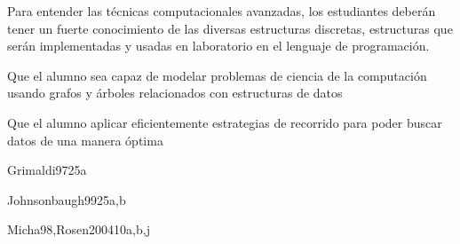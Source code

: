 \begin{syllabus}


\begin{justification}
Para entender las técnicas computacionales avanzadas, los estudiantes deberán tener un fuerte conocimiento de las
diversas estructuras discretas, estructuras que serán implementadas y usadas en laboratorio en el lenguaje de programación.
\end{justification}

\begin{goals}
\item Que el alumno sea capaz de modelar problemas de ciencia de la computación usando grafos y árboles relacionados con estructuras de datos
\item Que el alumno aplicar eficientemente estrategias de recorrido para poder buscar datos de una manera óptima
\end{goals}

\begin{outcomes}
\end{outcomes}

\begin{unit}{\DSBasicCountingDef}{Grimaldi97}{25}{a}
   \DSBasicCountingAllTopics
   \DSBasicCountingAllObjectives
\end{unit}

\begin{unit}{\DSGraphsAndTreesDef}{Johnsonbaugh99}{25}{a,b}
   \DSGraphsAndTreesAllTopics
   \DSGraphsAndTreesAllObjectives
\end{unit}

\begin{unit}{\DSDiscreteProbabilityDef}{Micha98,Rosen2004}{10}{a,b,j}
   \DSDiscreteProbabilityAllTopics
   \DSDiscreteProbabilityAllObjectives
\end{unit}



\begin{coursebibliography}
\end{coursebibliography}

\end{syllabus}

%
